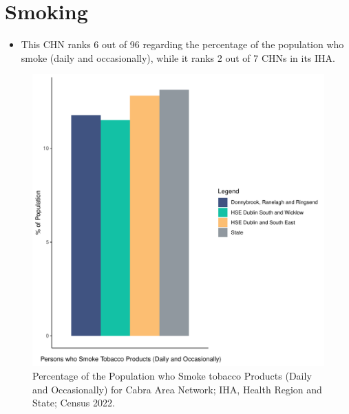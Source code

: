 \documentclass{article}
\begin{document}
\pagebreak

\section{Smoking}\label{sect:Smoking}
\begin{itemize}
\item This CHN ranks  6 out of 96 regarding the percentage of the population who smoke (daily and occasionally), while it ranks   2 out of 7 CHNs in its IHA.
\end{itemize}
\begin{figure}[H]
	\centering
	\includegraphics[width = 120mm]{../figures/SmokingED.pdf}
	\caption{Percentage of the Population who Smoke tobacco Products (Daily and Occasionally) for Cabra Area Network; IHA, Health Region and State; Census 2022.}
	\label{fig:2ae19629-1a6a-13a3-e055-000000000001}
	\end{figure}
	
\end{document}

